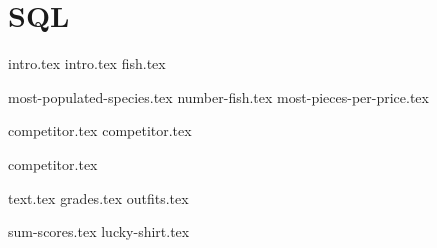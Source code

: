 \documentclass{exam}
\begin{document}
\section{SQL}
{intro.tex}
{intro.tex}
{fish.tex}
\begin{questions}
  {most-populated-species.tex}
  {number-fish.tex}
  {most-pieces-per-price.tex}
\end{questions}

\newpage
{competitor.tex}
{competitor.tex}
\begin{questions}
{competitor.tex}
\end{questions}

\newpage
{text.tex}
{grades.tex}
{outfits.tex}

\begin{questions}
{sum-scores.tex}
{lucky-shirt.tex}
\end{questions}


\end{document}
